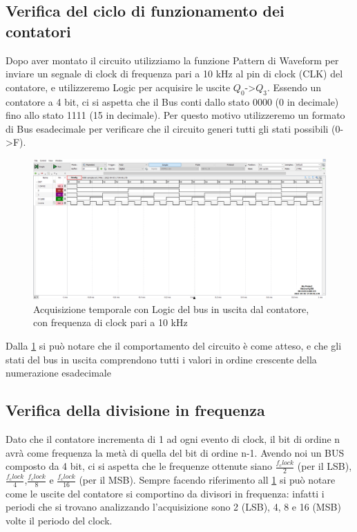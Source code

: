 \documentclass[10pt, a4paper, italian]{article}
\begin{document}
\subsection{Verifica del ciclo di funzionamento dei contatori}
Dopo aver montato il circuito utilizziamo la funzione Pattern di Waveform per inviare un segnale di clock di frequenza pari a 10 kHz al pin di clock (CLK) del contatore, e utilizzeremo Logic per acquisire le uscite $Q_0$->$Q_3$.
Essendo un contatore a 4 bit, ci si aspetta che il Bus conti dallo stato 0000 (0 in decimale) fino allo stato 1111 (15 in decimale).
Per questo motivo utilizzeremo un formato di Bus esadecimale per verificare che il circuito generi tutti gli stati possibili (0->F).
\begin{figure}[htbp]
\centering
	\includegraphics[width=\textwidth]{5.b}
	\caption{Acquisizione temporale con Logic del bus in uscita dal contatore, con frequenza di clock pari a 10 kHz \label{fig: Count_Clock}}
\end{figure}
Dalla \cref{fig: Count_Clock} si può notare che il comportamento del circuito è come atteso, e che gli stati del bus in uscita comprendono tutti i valori in ordine crescente della numerazione esadecimale 
\subsection{Verifica della divisione in frequenza}

Dato che il contatore incrementa di 1 ad ogni evento di clock, il bit di ordine n avrà come frequenza la metà di quella del bit di ordine n-1.
Avendo noi un BUS composto da 4 bit, ci si aspetta che le frequenze ottenute siano $\frac{f_clock}{2}$ (per il LSB),$\frac{f_clock}{4}$,$\frac{f_clock}{8}$ e $\frac{f_clock}{16}$ (per il MSB).
Sempre facendo riferimento all  \cref{fig: Count_Clock} si può notare come le uscite del contatore si comportino da divisori in frequenza: infatti i periodi che si trovano analizzando l'acquisizione sono 2 (LSB), 4, 8 e 16 (MSB) volte il periodo del clock.
\end{document}

